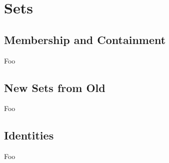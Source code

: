 \section{Sets}

\subsection{Membership and Containment}

Foo

\subsection{New Sets from Old}

Foo

\subsection{Identities}

Foo

